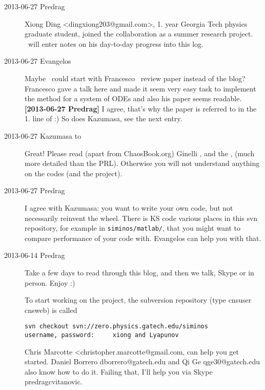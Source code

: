 \begin{description}

\item[2013-06-27 Predrag] Xiong Ding  <dingxiong203@gmail.com>,
1. year Georgia Tech physics graduate student, joined the
collaboration as a summer research project.
\XD\ will enter notes on his day-to-day progress into this log.

\item[2013-06-27 Evangelos] Maybe \XD\ could start with Francesco
    \etal\ review paper instead of the blog? Francesco
    gave a talk here and made it seem very easy task to implement the
    method for a system of ODEs and also his paper seems readable.
    \\
{\bf [2013-06-27 Predrag]}
I agree, that's why the paper is referred to in the 1. line of
 :) So does Kazumasa, see the next entry.

\item[2013-06-27 Kazumasa  to \XD]
Great! Please read (apart from ChaosBook.org)
Ginelli \etal{}
, and the
,
(much more detailed than the PRL).
Otherwise you will not understand anything on the codes (and the project).

\item[2013-06-27 Predrag]
I agree with Kazumasa: you want to write your own code,
but not necessarily reinvent the wheel. There is KS code various
places in this svn repository, for example in
\texttt{siminos/matlab/}, that you might want to compare performance
of your code with. Evangelos can help you with that.


\item[2013-06-14 Predrag]
Take a few days to read through this blog, and then we talk,
Skype or in person.
Enjoy :)

To start working on the {\cLvs} project,
the
 {subversion repository}
(type   cnsuser   cnsweb) is called
\begin{verbatim}
svn checkout svn://zero.physics.gatech.edu/siminos
username, password:     xiong and Lyapunov
\end{verbatim}
Chris Marcotte <christopher.marcotte@gmail.com, can help you get
started. Daniel Borrero dborrero@gatech.edu and Qi Ge
    qge30@gatech.edu also know how to do it. Failing that, I'll help
you via Skype predragcvitanovic.


\end{description}
